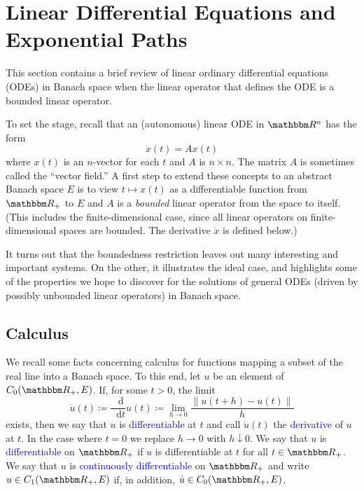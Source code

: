 \documentclass[12pt, reqno]{amsart}
\newcommand{\1}{\mathbbm 1}
\newcommand*\diff{\mathop{}\!\mathrm{d}}
\newcommand{\RR}{\mathbbm R}
\theoremstyle{plain}
\theoremstyle{definition}
\newcommand{\navy}[1]{\textcolor{blue}{#1}}
\begin{document}
\section{Linear Differential Equations and Exponential Paths}

This section contains a brief review of linear ordinary differential equations
(ODEs) in Banach space when the linear operator that defines the ODE is a
bounded linear operator.

To set the stage, recall that an (autonomous) linear ODE in $\RR^n$ has the form
%
\begin{equation*}
    \dot x(t) = A x(t)
\end{equation*}
%
where $x(t)$ is an $n$-vector for each $t$ and $A$ is $n \times n$.  The matrix
$A$ is sometimes called the ``vector field.''  A first step to extend these
concepts to an abstract Banach space $E$ is to view $t \mapsto x(t)$ as a
differentiable function from $\RR_+$ to $E$ and $A$ is a \emph{bounded} linear
operator from the space to itself.  (This includes the finite-dimensional case,
since all linear operators on finite-dimensional spaces are bounded.  The
derivative $\dot x$ is defined below.)

It turns out that the boundedness restriction leaves out many interesting and
important systems.  On the other, it illustrates the ideal case, and
highlights some of the properties we hope to discover for the solutions of
general ODEs (driven by possibly unbounded linear operators) in Banach space.  




\subsection{Calculus}\label{ss:calc}

We recall some facts concerning calculus for functions mapping a subset of the
real line into a Banach space. To this end, let $u$ be an element of $C_0(\RR_+,
E)$. If, for some $t > 0$, the limit
%
\begin{equation*}
    \dot u(t)
    \coloneq \frac{\diff }{\diff t} u(t)
    \coloneq \lim_{h \to 0} \frac{\| u(t + h) - u(t) \|}{h}
\end{equation*}
%
exists, then we say that $u$ is \navy{differentiable} at $t$ and call $\dot u(t)$
the \navy{derivative} of $u$ at $t$.  In the case where $t=0$ we 
replace $h \to 0$ with $h \downarrow 0$.
We say that $u$ is \navy{differentiable} on $\RR_+$ if $u$ is differentiable at
$t$ for all $t \in \RR_+$.
We say that $u$ is \navy{continuously differentiable} on $\RR_+$ and write $u
\in C_1(\RR_+, E)$ if, in
addition, $\dot u \in C_0(\RR_+, E)$. 
\end{document}
